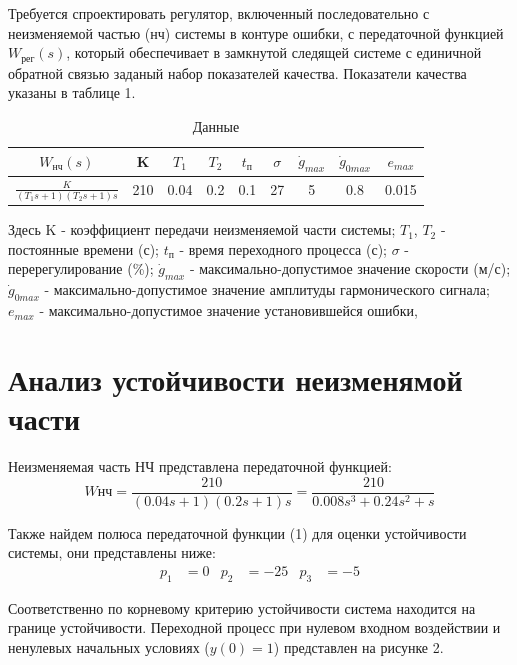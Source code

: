 \documentclass[russian, utf8]{eskdtext}
\renewcommand{\arraystretch}{1.3}
\begin{document}
Требуется спроектировать регулятор, включенный последовательно с неизменяемой частью (нч) системы в контуре ошибки, с передаточной функцией $W_\text{рег}(s)$, который обеспечивает в замкнутой следящей системе с единичной обратной связью заданый набор показателей качества. Показатели качества указаны в таблице 1. \par
\begin{table}[h!]
    \centering
    \begin{threeparttable}        
        \caption{Данные}
        \def\arraystretch{2}
        \begin{tabular} {|c|c|c|c|c|c|c|c|c|}
            \hline
            $W_\text{нч}(s)$ & K & $T_1$ & $T_2$ & $t_\text{п}$ & $\sigma$ & $\dot{g}_{max}$ & $\dot{g}_{0max}$ & $e_{max}$ \\ \hline 
            $\displaystyle\frac{K}{(T_1s + 1)(T_2s + 1)s}$ & 210 & 0.04 & 0.2 & 0.1 & 27 & 5 & 0.8 & 0.015 \\ [2mm] \hline 
        \end{tabular}
    \end{threeparttable}
\end{table}
Здесь
K - коэффициент передачи неизменяемой части системы;
$T_1$, $T_2$ - постоянные времени (с);
$t_\text{п}$ - время переходного процесса (с);
$\sigma$ - перерегулирование (\%);
$\dot{g}_{max}$ - максимально-допустимое значение скорости (м/с);
$\dot{g}_{0max}$ - максимально-допустимое значение амплитуды гармонического сигнала;
$e_{max}$ - максимально-допустимое значение установившейся ошибки, \par

\newpage
\section{Анализ устойчивости неизменямой части}

Неизменяемая часть НЧ представлена передаточной функцией:
\begin{equation}
    W\text{нч} = \frac{210}{(0.04s + 1)(0.2s + 1)s} = \frac{210}{0.008s^3 + 0.24s^2 + s}
\end{equation}

Также найдем полюса передаточной функции (1) для оценки устойчивости системы, они представлены ниже:
\begin{align*}
    p_1 & = 0 & p_2 & = -25 & p_3 & = -5
\end{align*}

Соответственно по корневому критерию устойчивости система находится на границе устойчивости. Переходной процесс при нулевом входном воздействии и ненулевых начальных условиях ($y(0) = 1$) представлен на рисунке 2.
\end{document}
